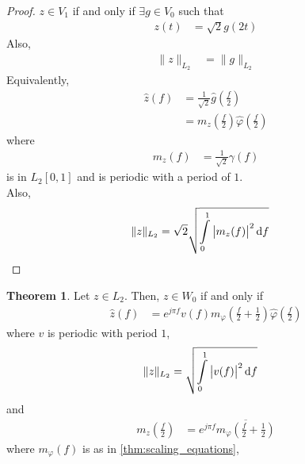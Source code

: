 \documentclass[titlepage, fleqn, a4paper, 12pt, twoside]{article}
\theoremstyle{definition}
\theoremstyle{theorem}
\newtheorem{theorem}{Theorem}
\begin{document}
\begin{proof}
	$z \in V_1$ if and only if $\exists g \in V_0$ such that
	\begin{align*}
		z(t) &= \sqrt{2} g(2 t)
	\end{align*}
	Also,
	\begin{align*}
		\|z\|_{L_2} &= \|g\|_{L_2}
	\end{align*}
	Equivalently,
	\begin{align*}
		\hat{z}(f) &= \frac{1}{\sqrt{2}} \hat{g}\left( \frac{f}{2} \right)\\
		&= m_z\left( \frac{f}{2} \right) \hat{\varphi}\left( \frac{f}{2} \right)
	\end{align*}
	where
	\begin{align*}
		m_z(f) &= \frac{1}{\sqrt{2}} \gamma(f)
	\end{align*}
	is in $L_2[0,1]$ and is periodic with a period of $1$.\\
	Also,
	\begin{align*}
		\|z\|_{L_2} &= \sqrt{2} \sqrt{\int\limits_{0}^{1} \left| m_z(f) \right|^2 \dif f}
	\end{align*}
\end{proof}

\begin{theorem}
	Let $z \in L_2$.
	Then, $z \in W_0$ if and only if
	\begin{align*}
		\hat{z}(f) &= e^{j \pi f} v(f) m_{\varphi}\left( \frac{f}{2} + \frac{1}{2} \right) \hat{\varphi}\left( \frac{f}{2} \right)
	\end{align*}
	where $v$ is periodic with period $1$,
	\begin{align*}
		\|z\|_{L_2} &= \sqrt{\int\limits_{0}^{1} \left| v(f) \right|^2 \dif f}
	\end{align*}
	and
	\begin{align*}
		m_z\left( \frac{f}{2} \right) &= e^{j \pi f} \overline{m_{\varphi}\left( \frac{f}{2} + \frac{1}{2} \right)}
	\end{align*}
	where $m_{\varphi}(f)$ is as in \cref{thm:scaling_equations},
\end{theorem}
\end{document}
